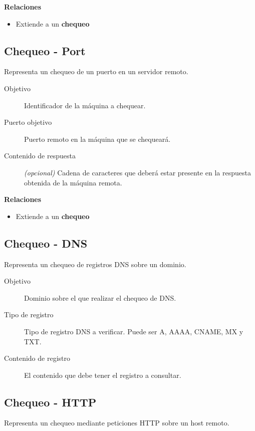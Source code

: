 \textbf{Relaciones}

\begin{itemize}
\item Extiende a un \textbf{chequeo}
\end{itemize}

\subsection{Chequeo - Port}

Representa un chequeo de un puerto en un servidor remoto.

\begin{description}
\item[Objetivo] Identificador de la máquina a chequear.
\item[Puerto objetivo] Puerto remoto en la máquina que se chequeará.
\item[Contenido de respuesta] \textit{(opcional)} Cadena de caracteres que
  deberá estar presente en la respuesta obtenida de la máquina remota.
\end{description}

\textbf{Relaciones}

\begin{itemize}
\item Extiende a un \textbf{chequeo}
\end{itemize}


\subsection{Chequeo - DNS}

Representa un chequeo de registros DNS sobre un dominio.

\begin{description}
\item[Objetivo] Dominio sobre el que realizar el chequeo de DNS.
\item[Tipo de registro] Tipo de registro DNS a verificar. Puede ser A, AAAA, CNAME, MX y TXT.
\item[Contenido de registro] El contenido que debe tener el registro a consultar.
\end{description}

\subsection{Chequeo - HTTP}

Representa un chequeo mediante peticiones HTTP sobre un host remoto.

